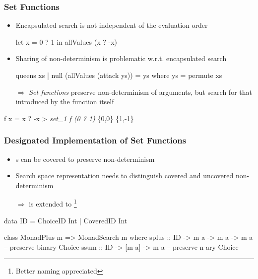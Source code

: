 \documentclass[
,hyperref={pdfpagelabels=false}
]{beamer}
\newcommand{\ergo}{$\Rightarrow$}
\begin{document}
\begin{frame}[fragile]%
\frametitle{Set Functions}

\begin{itemize}
\item Encapsulated search is not independent of the evaluation order

\begin{program}
let x = 0 ? 1 in allValues (x ? -x)
\end{program}

\pause

\item Sharing of non-determinism is problematic w.r.t. encapsulated
      search

\begin{program}
queens xs | null (allValues (attack ys)) = ys
  where ys = permute xs
\end{program}

\pause

  \item[\ergo] \emph{Set functions} preserve non-determinism of arguments,
               but search for that introduced by the function itself
\end{itemize}

\begin{example}
\begin{program}
f x = x ? -x
> \textsl{set_1 f (0 ? 1)}
\{0,0\}
\{1,-1\}
\end{program}
\end{example}

\end{frame}

\begin{frame}[fragile]%
\frametitle{Designated Implementation of Set Functions}

\begin{itemize}
  \item {}s can be covered to preserve non-determinism
  \item Search space representation needs to distinguish covered
        and uncovered non-determinism
  \item[\ergo]  is extended to \footnote{%
       Better naming appreciated}
\end{itemize}

\pause

\begin{haskell}
data ID = ChoiceID  Int
        | CoveredID Int
\end{haskell}

\begin{haskell}
class MonadPlus m => MonadSearch m where
  splus :: ID ->  m a  -> m a -> m a -- preserve binary Choice
  ssum  :: ID -> [m a] -> m a        -- preserve n-ary  Choice
\end{haskell}

\end{frame}
\end{document}
